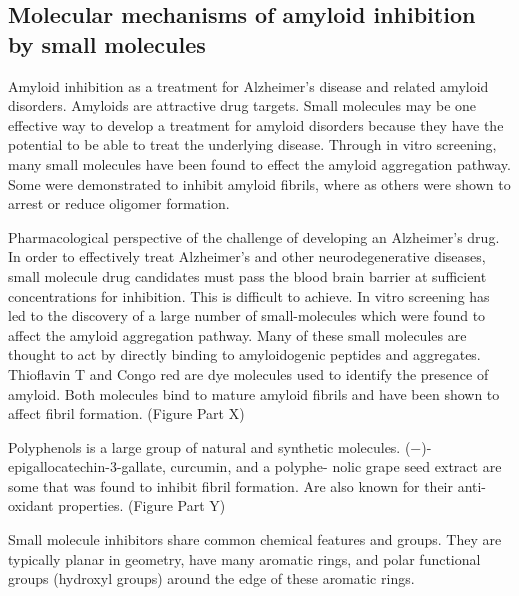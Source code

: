 \subsection{Molecular mechanisms of amyloid inhibition 
            \\ by small molecules}
\begin{outline}[enumerate]
    \1 Amyloid inhibition as a treatment for Alzheimer's disease and related amyloid disorders. Amyloids are attractive drug targets. Small molecules may be one effective way to develop a treatment for amyloid disorders because they have the potential to be able to treat the underlying disease. Through in vitro screening, many small molecules have been found to effect the amyloid aggregation pathway.  Some were demonstrated to inhibit amyloid fibrils, where as others were shown to arrest or reduce oligomer formation.   
      
      \2 Pharmacological perspective of the challenge of developing an Alzheimer's drug. In order to effectively treat Alzheimer's and other neurodegenerative diseases, small molecule drug candidates must pass the blood brain barrier at sufficient concentrations for inhibition.  This is difficult to achieve.
      \2 In vitro screening has led to the discovery of a large number of small-molecules which were found to affect the amyloid aggregation pathway. Many of these small molecules are thought to act by directly binding to amyloidogenic peptides and aggregates.
        \3 Thioflavin T and Congo red are dye molecules used to identify the presence of amyloid.  Both molecules bind to mature amyloid fibrils and have been shown to affect fibril formation. (Figure Part X)

        \3 Polyphenols is a large group of natural and synthetic molecules.  (−)-epigallocatechin-3-gallate, curcumin, and a polyphe- nolic grape seed extract are some that was found to inhibit fibril formation. Are also known for their anti-oxidant properties. (Figure Part Y) 
      
      \2 Small molecule inhibitors share common chemical features and groups.  They are typically planar in geometry, have many aromatic rings, and polar functional groups (hydroxyl groups) around the edge of these aromatic rings.
    

\end{outline}
